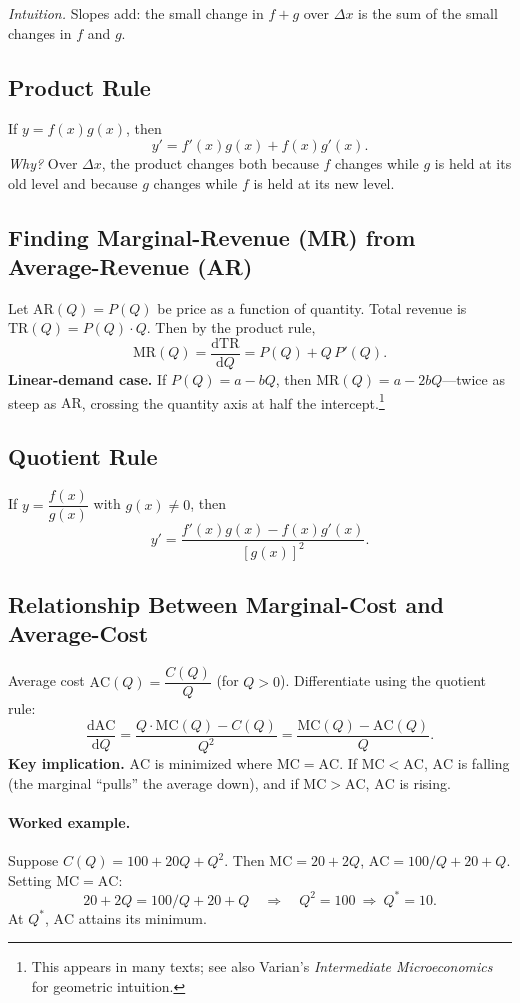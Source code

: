\documentclass[11pt]{article}
\newcommand{\dtotal}[2]{\frac{\mathrm{d} #1}{\mathrm{d} #2}}
\begin{document}
\textit{Intuition.} Slopes add: the small change in $f+g$ over $\Delta x$ is the sum of the small changes in $f$ and $g$.

\subsection*{Product Rule}
If $y=f(x)g(x)$, then
\[
y'=f'(x)g(x)+f(x)g'(x).
\]
\textit{Why?} Over $\Delta x$, the product changes both because $f$ changes while $g$ is held at its old level and because $g$ changes while $f$ is held at its new level.

\subsection*{Finding Marginal-Revenue (MR) from Average-Revenue (AR)}
Let $\mathrm{AR}(Q)=P(Q)$ be price as a function of quantity. Total revenue is $\mathrm{TR}(Q)=P(Q)\cdot Q$. Then by the product rule,
\[
\mathrm{MR}(Q)=\dtotal{\mathrm{TR}}{Q}=P(Q)+Q\,P'(Q).
\]
\textbf{Linear-demand case.} If $P(Q)=a-bQ$, then $\mathrm{MR}(Q)=a-2bQ$---twice as steep as $\mathrm{AR}$, crossing the quantity axis at half the intercept.\footnote{This appears in many texts; see also Varian's \textit{Intermediate Microeconomics} for geometric intuition.}

\subsection*{Quotient Rule}
If $y=\dfrac{f(x)}{g(x)}$ with $g(x)\neq 0$, then
\[
y'=\frac{f'(x)g(x)-f(x)g'(x)}{[g(x)]^2}.
\]

\subsection*{Relationship Between Marginal-Cost and Average-Cost}
Average cost $\mathrm{AC}(Q)=\dfrac{C(Q)}{Q}$ (for $Q>0$). Differentiate using the quotient rule:
\[
\dtotal{\mathrm{AC}}{Q}=\frac{Q\cdot \mathrm{MC}(Q)-C(Q)}{Q^2}
=\frac{\mathrm{MC}(Q)-\mathrm{AC}(Q)}{Q}.
\]
\textbf{Key implication.} $\mathrm{AC}$ is minimized where $\mathrm{MC}=\mathrm{AC}$. If $\mathrm{MC}<\mathrm{AC}$, $\mathrm{AC}$ is falling (the marginal ``pulls'' the average down), and if $\mathrm{MC}>\mathrm{AC}$, $\mathrm{AC}$ is rising.

\paragraph{Worked example.}
Suppose $C(Q)=100+20Q+Q^2$. Then $\mathrm{MC}=20+2Q$, $\mathrm{AC}=100/Q+20+Q$. Setting $\mathrm{MC}=\mathrm{AC}$:
\[
20+2Q=100/Q+20+Q \quad\Rightarrow\quad Q^2=100\ \Rightarrow\ Q^*=10.
\]
At $Q^*$, $\mathrm{AC}$ attains its minimum.
\end{document}
